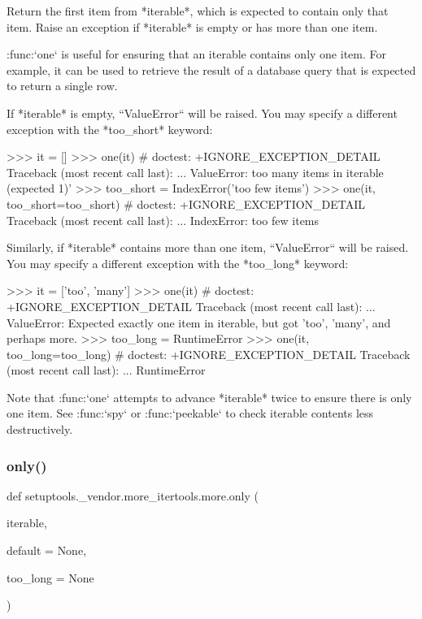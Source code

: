 \begin{DoxyVerb}Return the first item from *iterable*, which is expected to contain only
that item. Raise an exception if *iterable* is empty or has more than one
item.

:func:`one` is useful for ensuring that an iterable contains only one item.
For example, it can be used to retrieve the result of a database query
that is expected to return a single row.

If *iterable* is empty, ``ValueError`` will be raised. You may specify a
different exception with the *too_short* keyword:

    >>> it = []
    >>> one(it)  # doctest: +IGNORE_EXCEPTION_DETAIL
    Traceback (most recent call last):
    ...
    ValueError: too many items in iterable (expected 1)'
    >>> too_short = IndexError('too few items')
    >>> one(it, too_short=too_short)  # doctest: +IGNORE_EXCEPTION_DETAIL
    Traceback (most recent call last):
    ...
    IndexError: too few items

Similarly, if *iterable* contains more than one item, ``ValueError`` will
be raised. You may specify a different exception with the *too_long*
keyword:

    >>> it = ['too', 'many']
    >>> one(it)  # doctest: +IGNORE_EXCEPTION_DETAIL
    Traceback (most recent call last):
    ...
    ValueError: Expected exactly one item in iterable, but got 'too',
    'many', and perhaps more.
    >>> too_long = RuntimeError
    >>> one(it, too_long=too_long)  # doctest: +IGNORE_EXCEPTION_DETAIL
    Traceback (most recent call last):
    ...
    RuntimeError

Note that :func:`one` attempts to advance *iterable* twice to ensure there
is only one item. See :func:`spy` or :func:`peekable` to check iterable
contents less destructively.\end{DoxyVerb}
 \mbox{\label{namespacesetuptools_1_1__vendor_1_1more__itertools_1_1more_a1d62053e712ee970aacc4abfcf953bd6}} 
\subsubsection{\texorpdfstring{only()}{only()}}
{\footnotesize\ttfamily def setuptools.\+\_\+vendor.\+more\+\_\+itertools.\+more.\+only (\begin{DoxyParamCaption}\item[{}]{iterable,  }\item[{}]{default = {\ttfamily None},  }\item[{}]{too\+\_\+long = {\ttfamily None} }\end{DoxyParamCaption})}

